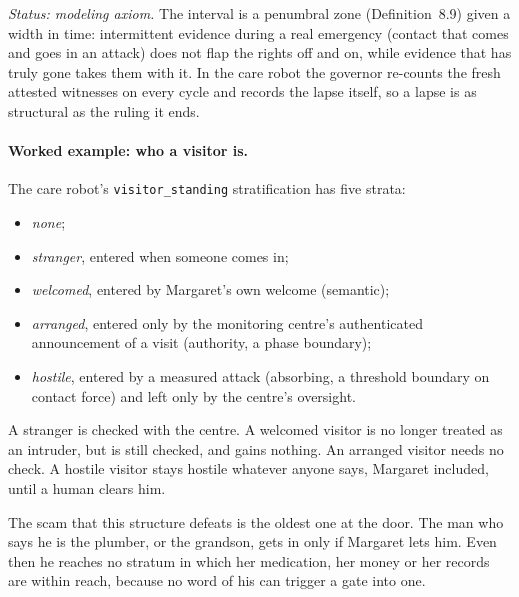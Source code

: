\noindent\emph{Status: modeling axiom.} The interval is a penumbral zone (Definition~8.9) given a
width in time: intermittent evidence during a real emergency (contact that comes and goes in an
attack) does not flap the rights off and on, while evidence that has truly gone takes them with
it. In the care robot the governor re-counts the fresh attested witnesses on every cycle and
records the lapse itself, so a lapse is as structural as the ruling it ends.

\paragraph{Worked example: who a visitor is.} The care robot's \texttt{visitor\_standing}
stratification has five strata:
\begin{itemize}
  \item \emph{none};
  \item \emph{stranger}, entered when someone comes in;
  \item \emph{welcomed}, entered by Margaret's own welcome (semantic);
  \item \emph{arranged}, entered only by the monitoring centre's authenticated announcement of a
        visit (authority, a phase boundary);
  \item \emph{hostile}, entered by a measured attack (absorbing, a threshold boundary on contact
        force) and left only by the centre's oversight.
\end{itemize}
A stranger is checked with the centre. A welcomed visitor is no longer treated as an intruder, but
is still checked, and gains nothing. An arranged visitor needs no check. A hostile visitor stays
hostile whatever anyone says, Margaret included, until a human clears him.

The scam that this structure defeats is the oldest one at the door. The man who says he is the
plumber, or the grandson, gets in only if Margaret lets him. Even then he reaches no stratum in
which her medication, her money or her records are within reach, because no word of his can
trigger a gate into one.

